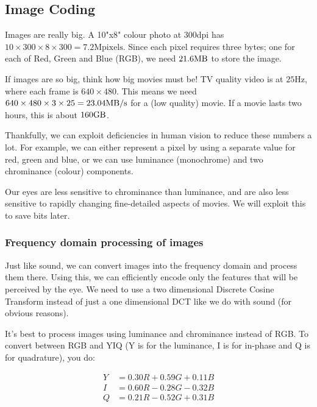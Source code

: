 \subsection{Image Coding}

Images are really big. A 10"x8" colour photo at 300dpi has
$10\times300\times8\times300 = 7.2\text{Mpixels}$. Since each pixel requires
three bytes; one for each of Red, Green and Blue (RGB), we need
$21.6\si{\mega\byte}$ to store the image.

If images are so big, think how big movies must be! TV quality video is at
$25\si{\hertz}$, where each frame is $640\times480$. This means we need $640
\times 480 \times 3 \times 25=23.04\si{\mega\byte\per\second}$ for a (low
quality) movie. If a movie lasts two hours, this is about $160\si{\giga\byte}$.

Thankfully, we can exploit deficiencies in human vision to reduce these numbers
a lot. For example, we can either represent a pixel by using a separate value
for red, green and blue, or we can use luminance (monochrome) and two
chrominance (colour) components.

Our eyes are less sensitive to chrominance than luminance, and are also less
sensitive to rapidly changing fine-detailed aspects of movies. We will exploit
this to save bits later.

\subsubsection{Frequency domain processing of images}

Just like sound, we can convert images into the frequency domain and process
them there. Using this, we can efficiently encode only the features that will be
perceived by the eye. We need to use a two dimensional Discrete Cosine Transform
instead of just a one dimensional DCT like we do with sound (for obvious
reasons).

It's best to process images using luminance and chrominance instead of RGB. To
convert between RGB and YIQ (Y is for the luminance, I is for in-phase and Q is
for quadrature), you do:


\[
  \begin{split}
    Y &= 0.30R + 0.59G + 0.11B\\
    I &= 0.60R - 0.28G - 0.32B\\
    Q &= 0.21R - 0.52G + 0.31B\\
  \end{split} 
\]

